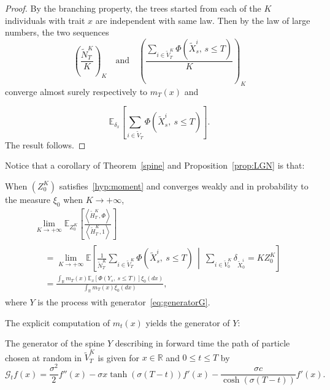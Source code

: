 \documentclass[10pt]{amsart}
\theoremstyle{definition}\newtheorem{defi}[theo]{Definition}\newtheorem{rema}[theo]{Remark}\newtheorem{exam}[theo]{Example}\newtheorem{exem}[theo]{Example}\newtheorem{nota}[theo]{Notation}
\newcommand{\Go}{\mathcal{G}}
\newcommand*\R{\mathbb{R}}
\newcommand*\E{\mathbb{E}}
\begin{document}
\begin{proof}
By the branching property, the trees started from each of the $K$ individuals with trait $x$ are independent with same law. Then by the law of large numbers, the two sequences
\[
\left(\frac{\widetilde N^K_{T}}{K}\right)_{K}\quad \text{and}\quad\left(\frac{\sum\limits_{i \in \widetilde{V}^K_{T}}\Phi\left(\widetilde X^i_{s},\, s\leq T\right)}{K}\right)_{K}
\]
converge almost surely respectively to $m_{T}(x)$ and

\[
\E_{\delta_{x}}\left[\sum_{i \in \widetilde V_{T}}\Phi\left(\widetilde X^i_{s},\ s\leq T\right) \right].
\]
The result follows.
\end{proof}



Notice that a corollary of Theorem~\ref{spine} and Proposition~\ref{prop:LGN} is that:
\begin{coro}\label{cor:hist-spine}
When $(Z^K_0)$ satisfies~\eqref{hyp:moment} and converges weakly and in probability to the measure $\xi_0$ when $K\rightarrow +\infty$,
\begin{multline}\label{eq:spine-processuslinearise}
\lim_{K \rightarrow +\infty}\E_{Z^K_0}\left[\frac{\left\langle \widetilde{H}^K_T,\Phi\right\rangle}{\left\langle \widetilde{H}^K_T,1\right\rangle}\right]\\
\begin{aligned}
&=\lim_{K \to +\infty}\E\left[\frac{1}{\widetilde N^K_{T}}\sum_{i \in \widetilde V^K_{T}}\Phi\left(\widetilde{X}^i_{s},\ s\leq T\right)\, \middle|\ \sum_{i \in \widetilde V^K_{0}} \delta_{\widetilde{X}^i_{0}}= K Z^K_0 \right] \\
&=\frac{ \int_{\R} m_{T}(x) \E_{x}\left[\Phi\left(Y_{s},\ s\leq T\right)\right]\xi_0(dx)}{\int_{\R} m_{T}(x) \xi_0(dx)},
\end{aligned}
\end{multline}
where $Y$ is the process with generator~\eqref{eq:generatorG}.
\end{coro}

The explicit computation of $m_t(x)$ yields the generator of $Y$:

\begin{prop}\label{prop:generatorG-explicite}
The generator of the spine $Y$ describing in forward time the path of particle chosen at random in $\widetilde V^K_T$ is given for $x\in \R$ and $0\le t\le T$ by
\begin{equation}\label{eq:generatorG-explicite}
\Go_{t}f(x)=\frac{\sigma^2}{2}f''(x)-\sigma x\tanh(\sigma (T-t))f'(x)-\frac{\sigma c}{\cosh(\sigma (T-t))} f'(x).
\end{equation}
\end{prop}
\end{document}
